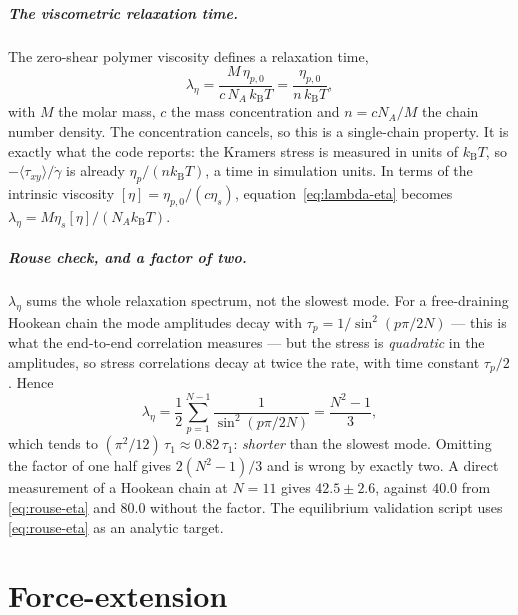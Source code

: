 \documentclass[11pt,a4paper]{report}
\newcommand{\kB}{k_\mathrm{B}}
\begin{document}
\paragraph{The viscometric relaxation time.} The zero-shear polymer viscosity
defines a relaxation time,
\begin{equation}
  \lambda_\eta = \frac{M\,\eta_{p,0}}{c\,N_A\,\kB T} = \frac{\eta_{p,0}}{n\,\kB T},
  \label{eq:lambda-eta}
\end{equation}
with $M$ the molar mass, $c$ the mass concentration and $n = cN_A/M$ the chain
number density. The concentration cancels, so this is a single-chain property. It
is exactly what the code reports: the Kramers stress is measured in units of
$\kB T$, so $-\langle\tau_{xy}\rangle/\dot\gamma$ is already
$\eta_p/(n\kB T)$, a time in simulation units. In terms of the intrinsic viscosity
$[\eta] = \eta_{p,0}/(c\eta_s)$, equation~\eqref{eq:lambda-eta} becomes
$\lambda_\eta = M\eta_s[\eta]/(N_A\kB T)$.

\paragraph{Rouse check, and a factor of two.} $\lambda_\eta$ sums the whole
relaxation spectrum, not the slowest mode. For a free-draining Hookean chain the
mode amplitudes decay with $\tau_p = 1/\sin^{2}(p\pi/2N)$ --- this is what the
end-to-end correlation measures --- but the stress is \emph{quadratic} in the
amplitudes, so stress correlations decay at twice the rate, with time constant
$\tau_p/2$. Hence
\begin{equation}
  \lambda_\eta = \frac12\sum_{p=1}^{N-1}\frac{1}{\sin^{2}(p\pi/2N)}
               = \frac{N^{2}-1}{3},
  \label{eq:rouse-eta}
\end{equation}
which tends to $(\pi^{2}/12)\,\tau_1 \approx 0.82\,\tau_1$: \emph{shorter} than the
slowest mode. Omitting the factor of one half gives $2(N^2-1)/3$ and is wrong by
exactly two. A direct measurement of a Hookean chain at $N=11$ gives
$42.5 \pm 2.6$, against $40.0$ from \eqref{eq:rouse-eta} and $80.0$ without the
factor. The equilibrium validation script uses \eqref{eq:rouse-eta} as an analytic
target.


\chapter{Force-extension}
\label{ch:force-extension}
\end{document}
